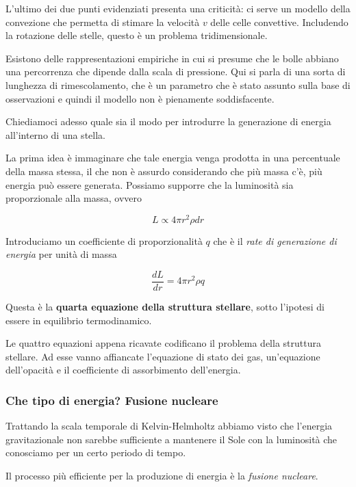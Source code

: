 L'ultimo dei due punti evidenziati presenta una criticità: ci serve un modello della convezione che permetta di stimare la velocità $v$ delle celle convettive. Includendo la rotazione delle stelle, questo è un problema tridimensionale.

Esistono delle rappresentazioni empiriche in cui si presume che le bolle abbiano una percorrenza che dipende dalla scala di pressione. Qui si parla di una sorta di lunghezza di rimescolamento, che è un parametro che è stato assunto sulla base di osservazioni e quindi il modello non è pienamente soddisfacente.

\vspace{0.2cm}Chiediamoci adesso quale sia il modo per introdurre la generazione di energia all'interno di una stella.

La prima idea è immaginare che tale energia venga prodotta in una percentuale della massa stessa, il che non è assurdo considerando che più massa c'è, più energia può essere generata. Possiamo supporre che la luminosità sia proporzionale alla massa, ovvero

$$L\propto 4\pi r^2\rho dr$$

Introduciamo un coefficiente di proporzionalità $q$ che è il \textit{rate di generazione di energia} per unità di massa

\begin{equation}
   \frac{dL}{dr}=4\pi r^2\rho q
    \label{struttura4} 
\end{equation}

Questa è la \textbf{quarta equazione della struttura stellare}, sotto l'ipotesi di essere in equilibrio termodinamico.

\vspace{0.2cm}Le quattro equazioni appena ricavate codificano il problema della struttura stellare. Ad esse vanno affiancate l'equazione di stato dei gas, un'equazione dell'opacità e il coefficiente di assorbimento dell'energia.

\subsubsection{Che tipo di energia? Fusione nucleare}
Trattando la scala temporale di Kelvin-Helmholtz abbiamo visto che l'energia gravitazionale non sarebbe sufficiente a mantenere il Sole con la luminosità che conosciamo per un certo periodo di tempo.

Il processo più efficiente per la produzione di energia è la \textit{fusione nucleare}.

